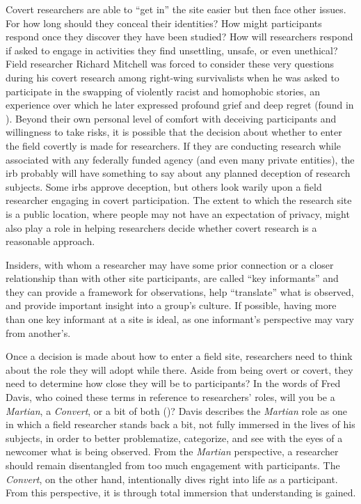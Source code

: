 Covert researchers are able to ``get in'' the site easier but then face other issues. For how long should they conceal their identities? How might participants respond once they discover they have been studied? How will researchers respond if asked to engage in activities they find unsettling, unsafe, or even unethical? Field researcher Richard Mitchell was forced to consider these very questions during his covert research among right-wing survivalists when he was asked to participate in the swapping of violently racist and homophobic stories, an experience over which he later expressed profound grief and deep regret (found in \cite{fieldwork1991inside}). Beyond their own personal level of comfort with deceiving participants and willingness to take risks, it is possible that the decision about whether to enter the field covertly is made for researchers. If they are conducting research while associated with any federally funded agency (and even many private entities), the \gls{irb} probably will have something to say about any planned deception of research subjects. Some \glspl{irb} approve deception, but others look warily upon a field researcher engaging in covert participation. The extent to which the research site is a public location, where people may not have an expectation of privacy, might also play a role in helping researchers decide whether covert research is a reasonable approach.

Insiders, with whom a researcher may have some prior connection or a closer relationship than with other site participants, are called ``key informants'' and they can provide a framework for observations, help ``translate'' what is observed, and provide important insight into a group's culture. If possible, having more than one key informant at a site is ideal, as one informant's perspective may vary from another's.

Once a decision is made about how to enter a field site, researchers need to think about the role they will adopt while there. Aside from being overt or covert, they need to determine how close they will be to participants? In the words of Fred Davis, who coined these terms in reference to researchers' roles, will you be a \textit{Martian}, a \textit{Convert}, or a bit of both (\cite{davis1973martian})? Davis describes the \textit{Martian} role as one in which a field researcher stands back a bit, not fully immersed in the lives of his subjects, in order to better problematize, categorize, and see with the eyes of a newcomer what is being observed. From the \textit{Martian} perspective, a researcher should remain disentangled from too much engagement with participants. The \textit{Convert}, on the other hand, intentionally dives right into life as a participant. From this perspective, it is through total immersion that understanding is gained.

